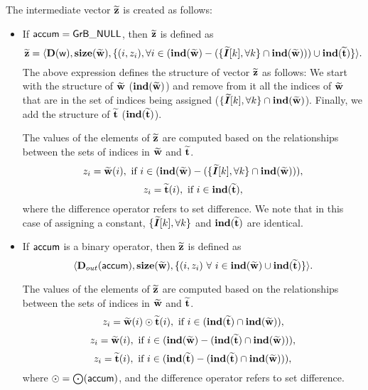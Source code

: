 The intermediate vector ${\bf \widetilde{z}}$ is created as follows:
\begin{itemize}
    \item If ${\sf accum} = {\sf GrB\_NULL}$, then ${\bf \widetilde{z}}$ is defined as 
    \[ 
        {\bf \widetilde{z}} =
		\langle \bold{D}({\sf w}), \bold{size}({\bf \widetilde{w}}), 
		\{(i,z_{i}), \forall i \in (\bold{ind}({\bf \widetilde{w}})-(\{\bm{\widetilde{I}}[k],\forall k\} \cap \bold{ind}({\bf \widetilde{w}}))) \cup 
        \bold{ind}({\bf \widetilde{t}}) \} \rangle.
    \]
    The above expression defines the structure of vector ${\bf \widetilde{z}}$ as follows:
    We start with the structure of ${\bf \widetilde{w}}$ ($\bold{ind}({\bf \widetilde{w}})$) and remove from 
    it all the indices of ${\bf \widetilde{w}}$ that are
    in the set of indices being assigned ($\{\bm{\widetilde{I}}[k],\forall k\} \cap \bold{ind}({\bf \widetilde{w}})$). Finally, we
    add the structure of ${\bf \widetilde{t}}$ ($\bold{ind}({\bf \widetilde{t}})$).

    The values of the elements of ${\bf \widetilde{z}}$ are computed based on the 
    relationships between the sets of indices in ${\bf \widetilde{w}}$ 
    and ${\bf \widetilde{t}}$.
    \[
        z_{i} = \vector{\widetilde{w}}(i), \ \mbox{if}\  i \in  
        (\bold{ind}(\vector{\widetilde{w}}) - (\{\grbarray{\widetilde{I}}[k],\forall k\}
        \cap \bold{ind}(\vector{\widetilde{w}}))),
    \]
    \[
        z_{i} = \vector{\widetilde{t}}(i), \ \mbox{if}\  i \in  
        \bold{ind}(\vector{\widetilde{t}}),
    \]
    where the difference operator refers to set difference.
    We note that in this case of assigning a constant, 
    $\{\bm{\widetilde{I}}[k],\forall k\}$ 
    and $\bold{ind}({\bf \widetilde{t}})$ are identical.

    \item If ${\sf accum}$ is a binary operator, then ${\bf \widetilde{z}}$ is defined as
        \[ \langle \mbox{$\mathbf{D}_{out}$}({\sf accum}), \bold{size}({\bf \widetilde{w}}),
        \{(i,z_{i}) \ \forall \ i \in \bold{ind}({\bf \widetilde{w}}) \cup 
        \bold{ind}({\bf \widetilde{t}}) \} \rangle.\]

    The values of the elements of ${\bf \widetilde{z}}$ are computed based on the 
    relationships between the sets of indices in ${\bf \widetilde{w}}$ and 
    ${\bf \widetilde{t}}$.
\[
    z_{i} = {\bf \widetilde{w}}(i) \odot {\bf \widetilde{t}}(i), \ \mbox{if}\  
    i \in  (\bold{ind}({\bf \widetilde{t}}) \cap \bold{ind}({\bf \widetilde{w}})),
\]
\[
    z_{i} = {\bf \widetilde{w}}(i), \ \mbox{if}\  
    i \in (\bold{ind}({\bf \widetilde{w}}) - (\bold{ind}({\bf \widetilde{t}})
    \cap \bold{ind}({\bf \widetilde{w}}))),
\]
\[
    z_{i} = \vector{\widetilde{t}}(i), \ \mbox{if}\  i \in  
    (\bold{ind}(\vector{\widetilde{t}}) - (\bold{ind}(\vector{\widetilde{t}})
    \cap \bold{ind}(\vector{\widetilde{w}}))),
\]
where $\odot  = \bigodot({\sf accum})$, and the difference operator refers to set difference.
\end{itemize}

